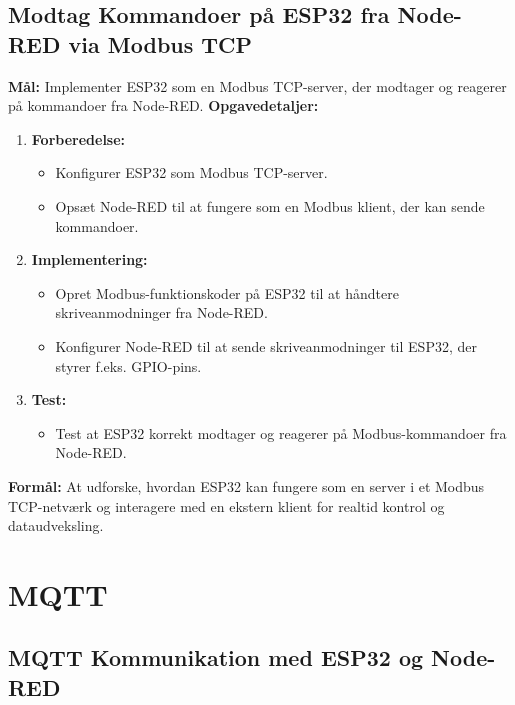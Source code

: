 \documentclass[12pt,a4paper]{book}
\begin{document}
	\subsection*{Modtag Kommandoer på ESP32 fra Node-RED via Modbus TCP}
	\textbf{Mål:} Implementer ESP32 som en Modbus TCP-server, der modtager og reagerer på kommandoer fra Node-RED.
	\newline\newline\noindent
	\textbf{Opgavedetaljer:}
	\begin{enumerate}
		\item \textbf{Forberedelse:}
		\begin{itemize}
			\item Konfigurer ESP32 som Modbus TCP-server.
			\item Opsæt Node-RED til at fungere som en Modbus klient, der kan sende kommandoer.
		\end{itemize}
		\item \textbf{Implementering:}
		\begin{itemize}
			\item Opret Modbus-funktionskoder på ESP32 til at håndtere skriveanmodninger fra Node-RED.
			\item Konfigurer Node-RED til at sende skriveanmodninger til ESP32, der styrer f.eks. GPIO-pins.
		\end{itemize}
		\item \textbf{Test:}
		\begin{itemize}
			\item Test at ESP32 korrekt modtager og reagerer på Modbus-kommandoer fra Node-RED.
		\end{itemize}
	\end{enumerate}
	\textbf{Formål:} At udforske, hvordan ESP32 kan fungere som en server i et Modbus TCP-netværk og interagere med en ekstern klient for realtid kontrol og dataudveksling.
	
	\section{MQTT}
	\subsection*{MQTT Kommunikation med ESP32 og Node-RED}
\end{document}
